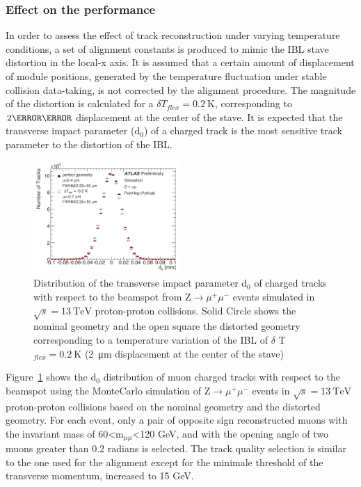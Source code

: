 \subsubsection{Effect on the performance}
In order to assess the effect of track reconstruction under varying temperature conditions, a set of alignment
constants is produced to mimic the IBL stave distortion in the local-x axis. It is assumed that
a certain amount of displacement of module positions, generated by the temperature fluctuation under
stable collision data-taking, is not corrected by the alignment procedure.
The magnitude of the distortion is calculated for a $\delta T_{flex} = \SI{0.2}{\kelvin}$, corresponding to $2\micro \meter$ displacement at the center of the stave.
It is expected that the transverse impact parameter (d$_0$) of a charged track is the most sensitive track
parameter to the distortion of the IBL.
\begin{figure}
\centering
\includegraphics[width=0.5\textwidth]{Images/IBL_commissioning/ibl_d0effect.png}
\caption{Distribution of the transverse impact parameter d$_0$ of charged tracks with respect to the beamspot from Z$\rightarrow \mu^+ \mu ^-$ events simulated in $\sqrt{s}= \SI{13}{\TeV}$ proton-proton collisions. Solid Circle shows the nominal geometry and the open square the distorted geometry corresponding to a temperature variation of the IBL of $\delta$ T$_{flex} = \SI{0.2}{\kelvin}$ (\SI{2}{\micro \meter} displacement at the center of the stave)}
\label{fig:d0effect}
\end{figure}
Figure~\ref{fig:d0effect} shows the d$_0$ distribution of muon charged tracks with respect to the beamspot using the MonteCarlo simulation of Z$\rightarrow \mu^+ \mu ^-$ events in $\sqrt{s}= \SI{13}{\TeV}$ proton-proton collisions based on the nominal geometry and the distorted geometry. For each event, only a pair of opposite sign reconstructed muons with the invariant mass of 60<m$_{\mu \mu}$<120 GeV, and with the opening angle of two muons greater than 0.2 radians is selected. The track quality selection is similar to the one used for the alignment except for the minimale threshold of the transverse momentum, increased to 15 GeV.
